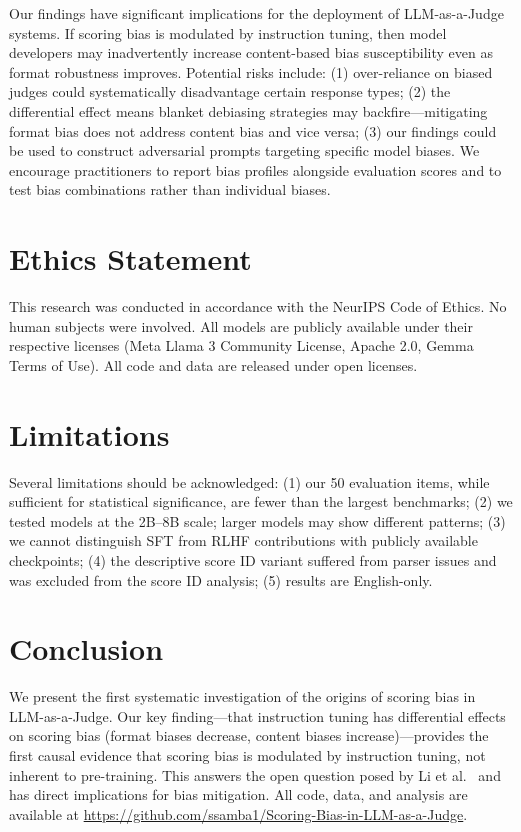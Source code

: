 \documentclass[11pt]{article}
\begin{document}
Our findings have significant implications for the deployment of LLM-as-a-Judge systems. If scoring bias is modulated by instruction tuning, then model developers may inadvertently increase content-based bias susceptibility even as format robustness improves. Potential risks include: (1) over-reliance on biased judges could systematically disadvantage certain response types; (2) the differential effect means blanket debiasing strategies may backfire---mitigating format bias does not address content bias and vice versa; (3) our findings could be used to construct adversarial prompts targeting specific model biases. We encourage practitioners to report bias profiles alongside evaluation scores and to test bias combinations rather than individual biases.

\section{Ethics Statement}

This research was conducted in accordance with the NeurIPS Code of Ethics. No human subjects were involved. All models are publicly available under their respective licenses (Meta Llama 3 Community License, Apache 2.0, Gemma Terms of Use). All code and data are released under open licenses.

\section{Limitations}

Several limitations should be acknowledged: (1) our 50 evaluation items, while sufficient for statistical significance, are fewer than the largest benchmarks; (2) we tested models at the 2B--8B scale; larger models may show different patterns; (3) we cannot distinguish SFT from RLHF contributions with publicly available checkpoints; (4) the descriptive score ID variant suffered from parser issues and was excluded from the score ID analysis; (5) results are English-only.

\section{Conclusion}

We present the first systematic investigation of the origins of scoring bias in LLM-as-a-Judge. Our key finding---that instruction tuning has differential effects on scoring bias (format biases decrease, content biases increase)---provides the first causal evidence that scoring bias is modulated by instruction tuning, not inherent to pre-training. This answers the open question posed by Li et al.~\cite{li2025scoring} and has direct implications for bias mitigation. All code, data, and analysis are available at \url{https://github.com/ssamba1/Scoring-Bias-in-LLM-as-a-Judge}.
\end{document}
